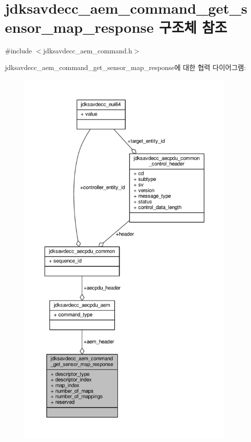 \hypertarget{structjdksavdecc__aem__command__get__sensor__map__response}{}\section{jdksavdecc\+\_\+aem\+\_\+command\+\_\+get\+\_\+sensor\+\_\+map\+\_\+response 구조체 참조}
\label{structjdksavdecc__aem__command__get__sensor__map__response}


{\ttfamily \#include $<$jdksavdecc\+\_\+aem\+\_\+command.\+h$>$}



jdksavdecc\+\_\+aem\+\_\+command\+\_\+get\+\_\+sensor\+\_\+map\+\_\+response에 대한 협력 다이어그램\+:
\nopagebreak
\begin{figure}[H]
\begin{center}
\leavevmode
\includegraphics[height=550pt]{structjdksavdecc__aem__command__get__sensor__map__response__coll__graph}
\end{center}
\end{figure}

